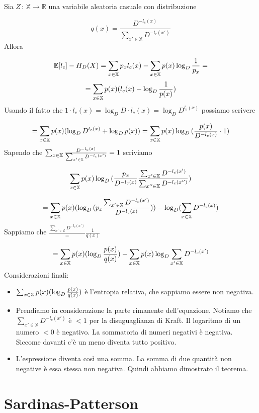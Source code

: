 \documentclass[12pt]{report}
\begin{document}
    \begin{dimo}
        Sia $Z\,:\, \mathbb{X} \rightarrow \mathbb{R}$ una variabile aleatoria casuale con distribuzione

        $$q(x) = \frac{D^{-l_c(x)}}{\sum_{x' \in \mathbb{X} } D^{-l_c(x')}}$$
        Allora

        $$\mathbb{E}[l_c] - H_D(X) = \sum_{x \in \mathbb{X}} p_x l_c(x) - \sum_{x \in \mathbb{X}} p(x) \log_D{\frac{1}{p_x}} =$$
        $$= \sum_{x \in \mathbb{X}} p(x)(l_c(x) - \log_D{\frac{1}{p(x)}})$$
        Usando il fatto che $1 \cdot l_c(x) = \log_D{D} \cdot l_c(x) = \log_D{D^{l_c(x)}}$ possiamo scrivere

        $$= \sum_{x \in \mathbb{X}} p(x) (\log_D{D^{l_c(x)}} + \log_D{p(x)}) = \sum_{x \in \mathbb{X}} p(x) \log_D{(\frac{p(x)}{D^{-l_c(x)}} \cdot 1)}$$
        Sapendo che $\sum_{x \in \mathbb{X}} \frac{D^{-l_c(x)}}{\sum_{x' \in \mathbb{X}} D^{-l_c(x')}} = 1$ scriviamo

        $$\sum_{x \in \mathbb{X}} p(x) \log_D{(\frac{p_x}{D^{-l_c(x)}} \frac{ \sum_{x' \in \mathbb{X}} D^{-l_c(x')}}{\sum_{x'' \in \mathbb{X}} D^{-l_c(x'')}})}$$

        $$=  \sum_{x \in \mathbb{X}} p(x) (\log_D{(p_x \frac{\sum_{x' \in \mathbb{X} } D^{-l_c(x')}}{D^{-l_c(x)}})}) - \log_D(\sum_{x \in \mathbb{X}} D^{-l_c(x)})$$
        Sappiamo che $\frac{\sum_{x' \in \mathbb{X} } D^{-l_c(x')}} = \frac{1}{q(x)}$

        $$= \sum_{x \in \mathbb{X}} p(x) (\log_D{\frac{p(x)}{q(x)}}) - \sum_{x \in \mathbb{X}} p(x) \log_D{\sum_{x' \in \mathbb{X}} D^{-l_c(x')}}$$
        Considerazioni finali:

        \begin{itemize}
            \item $\sum_{x \in \mathbb{X}} p(x) (\log_D{\frac{p(x)}{q(x)}})$ è l'entropia relativa, che sappiamo essere non negativa.
            \item Prendiamo in considerazione la parte rimanente dell'equazione. Notiamo che $\sum_{x' \in \mathbb{X}} D^{-l_c(x')}$ è $<1$ per la disuguaglianza di Kraft. Il logaritmo di un numero $<0$ è negativo. La sommatoria di numeri negativi è negativa. Siccome davanti c'è un meno diventa tutto positivo.
            \item L'espressione diventa così una somma. La somma di due quantità non negative è essa stessa non negativa. Quindi abbiamo dimostrato il teorema.
        \end{itemize}
    \end{dimo}


    \section{Sardinas-Patterson}
\end{document}
